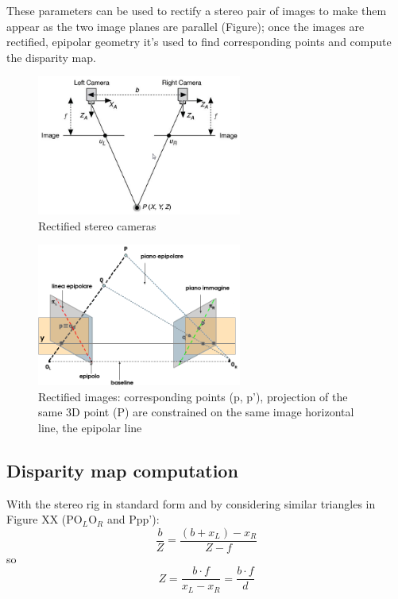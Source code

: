 These parameters can be used to rectify a stereo pair of images to make them appear as the two image planes are parallel (Figure); once the images are rectified, epipolar geometry it's used to find corresponding points and compute the disparity map.\\
\begin{figure}[h!]
\centering
\includegraphics[width=0.6\textwidth]{./img/rect_stereo.png}
\caption{\small{Rectified stereo cameras}}
\label{fig:rect_stereo}
\end{figure}
\begin{figure}[h!]
\centering
\includegraphics[width=0.6\textwidth]{./img/standard.png}
\caption{\small{Rectified images: corresponding points (p, p'), projection of the same 3D point (P) are constrained on the same image horizontal line, the epipolar line}}
\label{fig:std}
\end{figure}

\newpage
\subsection{Disparity map computation}

With the stereo rig in standard form and by considering similar triangles in Figure XX (PO$_{L}$O$_{R}$ and Ppp'): 
$$
\frac{b}{Z} = \frac{(b+x_{L}) - x_{R}}{Z-f} 
$$ 
so
$$
Z = \frac{b \cdot f}{x_{L} - x_{R}} = \frac{b \cdot f}{d}
$$ 

